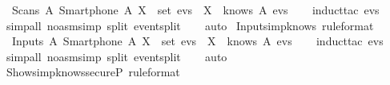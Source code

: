 \begin{isabellebody}
  \ \ {\isachardoublequoteopen}Scans\ A\ {\isacharparenleft}Smartphone\ A{\isacharparenright}\ X\ {\isasymin}\ set\ evs\ {\isasymlongrightarrow}\ X\ {\isasymin}\ knows\ A\ evs{\isachardoublequoteclose}\isanewline
  \isadelimproof
  \ \ %
  \endisadelimproof
  \isatagproof
  \isamarkupfalse%
  \ {\isacharparenleft}induct{\isacharunderscore}tac\ {\isachardoublequoteopen}evs{\isachardoublequoteclose}{\isacharparenright}\isanewline
  \ \ \isamarkupfalse%
  \ {\isacharparenleft}simp{\isacharunderscore}all\ {\isacharparenleft}no{\isacharunderscore}asm{\isacharunderscore}simp{\isacharparenright}\ split{\isacharcolon}\ event{\isachardot}split{\isacharparenright}\isanewline
  \ \ \isamarkupfalse%
  \ {\isacharparenleft}auto{\isacharparenright}\isanewline
  \isamarkupfalse%
  \isanewline
  \isanewline
  \endisatagproof
  {\isafoldproof}%
  \isadelimproof
  \isanewline
  \endisadelimproof
  \isamarkupfalse%
  \ Inputs{\isacharunderscore}imp{\isacharunderscore}knows\ {\isacharbrackleft}rule{\isacharunderscore}format{\isacharbrackright}\ {\isacharcolon}\isanewline
  \ \ {\isachardoublequoteopen}Inputs\ A\ {\isacharparenleft}Smartphone\ A{\isacharparenright}\ X\ {\isasymin}\ set\ evs\ {\isasymlongrightarrow}\ X\ {\isasymin}\ knows\ A\ evs{\isachardoublequoteclose}\isanewline
  \isadelimproof
  \isanewline
  \ \ %
  \endisadelimproof
  \isatagproof
  \isamarkupfalse%
  \ {\isacharparenleft}induct{\isacharunderscore}tac\ {\isachardoublequoteopen}evs{\isachardoublequoteclose}{\isacharparenright}\isanewline
  \ \ \isamarkupfalse%
  \ {\isacharparenleft}simp{\isacharunderscore}all\ {\isacharparenleft}no{\isacharunderscore}asm{\isacharunderscore}simp{\isacharparenright}\ split{\isacharcolon}\ event{\isachardot}split{\isacharparenright}\isanewline
  \ \ \isamarkupfalse%
  \ {\isacharparenleft}auto{\isacharparenright}\isanewline
  \isamarkupfalse%
  \isanewline
  \isanewline
  \isanewline
  \isanewline
  \endisatagproof
  {\isafoldproof}%
  \isadelimproof
  \isanewline
  \endisadelimproof
  \isamarkupfalse%
  \ Shows{\isacharunderscore}imp{\isacharunderscore}knows{\isacharunderscore}secureP\ {\isacharbrackleft}rule{\isacharunderscore}format{\isacharbrackright}\ {\isacharcolon}\isanewline

\end{isabellebody}
